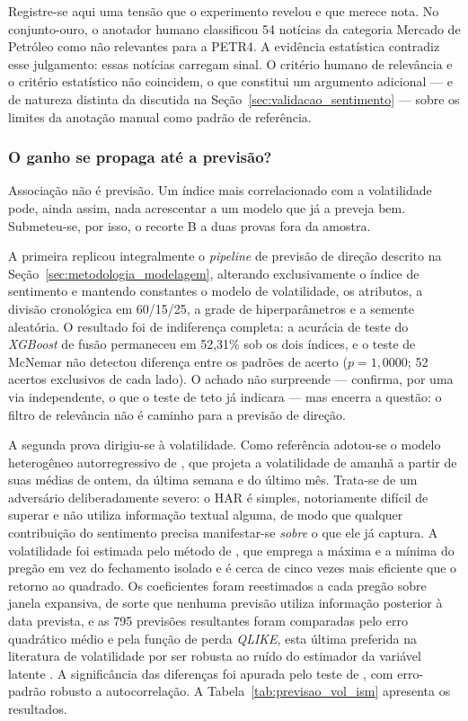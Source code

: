 Registre-se aqui uma tensão que o experimento revelou e que merece nota. No conjunto-ouro, o
anotador humano classificou 54 notícias da categoria Mercado de Petróleo como não relevantes para a
PETR4. A evidência estatística contradiz esse julgamento: essas notícias carregam sinal. O critério
humano de relevância e o critério estatístico não coincidem, o que constitui um argumento adicional
--- e de natureza distinta da discutida na Seção~\ref{sec:validacao_sentimento} --- sobre os limites
da anotação manual como padrão de referência.

\subsubsection{O ganho se propaga até a previsão?}

Associação não é previsão. Um índice mais correlacionado com a volatilidade pode, ainda assim, nada
acrescentar a um modelo que já a preveja bem. Submeteu-se, por isso, o recorte B a duas provas fora
da amostra.

A primeira replicou integralmente o \textit{pipeline} de previsão de direção descrito na
Seção~\ref{sec:metodologia_modelagem}, alterando exclusivamente o índice de sentimento e mantendo
constantes o modelo de volatilidade, os atributos, a divisão cronológica em 60/15/25, a grade de
hiperparâmetros e a semente aleatória. O resultado foi de indiferença completa: a acurácia de teste
do \textit{XGBoost} de fusão permaneceu em 52,31\% sob os dois índices, e o teste de McNemar não
detectou diferença entre os padrões de acerto ($p = 1{,}0000$; 52 acertos exclusivos de cada lado).
O achado não surpreende --- confirma, por uma via independente, o que o teste de teto já indicara ---
mas encerra a questão: o filtro de relevância não é caminho para a previsão de direção.

A segunda prova dirigiu-se à volatilidade. Como referência adotou-se o modelo heterogêneo
autorregressivo de , que projeta a volatilidade de amanhã a partir de
suas médias de ontem, da última semana e do último mês. Trata-se de um adversário deliberadamente
severo: o HAR é simples, notoriamente difícil de superar e não utiliza informação textual alguma, de
modo que qualquer contribuição do sentimento precisa manifestar-se \emph{sobre} o que ele já captura.
A volatilidade foi estimada pelo método de , que emprega a máxima
e a mínima do pregão em vez do fechamento isolado e é cerca de cinco vezes mais eficiente que o
retorno ao quadrado. Os coeficientes foram reestimados a cada pregão sobre janela expansiva, de sorte
que nenhuma previsão utiliza informação posterior à data prevista, e as 795 previsões resultantes
foram comparadas pelo erro quadrático médio e pela função de perda \textit{QLIKE}, esta última
preferida na literatura de volatilidade por ser robusta ao ruído do estimador da variável latente
\cite{patton_volatility_2011}. A significância das diferenças foi apurada pelo teste de
, com erro-padrão robusto a autocorrelação. A
Tabela~\ref{tab:previsao_vol_ism} apresenta os resultados.

